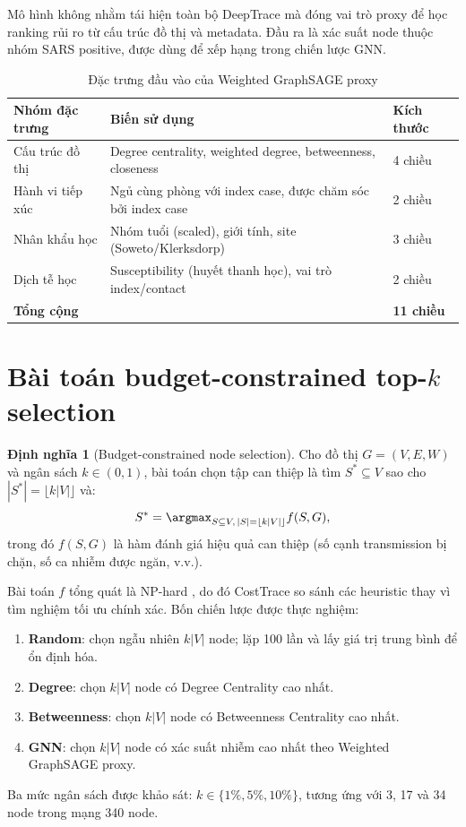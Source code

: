 \documentclass[12pt,a4paper]{report}
\theoremstyle{definition}
\newtheorem{definition}{Định nghĩa}[chapter]
\begin{document}
Mô hình không nhằm tái hiện toàn bộ DeepTrace mà đóng vai trò proxy để học ranking rủi ro từ cấu trúc đồ thị và metadata. Đầu ra là xác suất node thuộc nhóm SARS positive, được dùng để xếp hạng trong chiến lược GNN.

\begin{table}[H]
\centering
\caption{Đặc trưng đầu vào của Weighted GraphSAGE proxy}
\label{tab:gnn_features}
\begin{tabularx}{\textwidth}{L{4.5cm} Y L{3cm}}
\toprule
\textbf{Nhóm đặc trưng} & \textbf{Biến sử dụng} & \textbf{Kích thước}\\
\midrule
Cấu trúc đồ thị & Degree centrality, weighted degree, betweenness, closeness & 4 chiều\\
Hành vi tiếp xúc & Ngủ cùng phòng với index case, được chăm sóc bởi index case & 2 chiều\\
Nhân khẩu học & Nhóm tuổi (scaled), giới tính, site (Soweto/Klerksdorp) & 3 chiều\\
Dịch tễ học & Susceptibility (huyết thanh học), vai trò index/contact & 2 chiều\\
\midrule
\textbf{Tổng cộng} & & \textbf{11 chiều}\\
\bottomrule
\end{tabularx}
\end{table}

\section{Bài toán budget-constrained top-\texorpdfstring{$k$}{k} selection}

\begin{definition}[Budget-constrained node selection]
Cho đồ thị $G=(V,E,W)$ và ngân sách $k \in (0,1)$, bài toán chọn tập can thiệp là tìm $S^* \subseteq V$ sao cho $|S^*| = \lfloor k|V| \rfloor$ và:
\begin{equation}
  S^* = \argmax_{S \subseteq V,\, |S|=\lfloor k|V|\rfloor} f(S, G),
  \label{eq:topk}
\end{equation}
trong đó $f(S, G)$ là hàm đánh giá hiệu quả can thiệp (số cạnh transmission bị chặn, số ca nhiễm được ngăn, v.v.).
\end{definition}

Bài toán $f$ tổng quát là NP-hard \cite{kempe2003}, do đó CostTrace so sánh các heuristic thay vì tìm nghiệm tối ưu chính xác. Bốn chiến lược được thực nghiệm:
\begin{enumerate}[label=(\arabic*), itemsep=4pt]
  \item \textbf{Random}: chọn ngẫu nhiên $k|V|$ node; lặp 100 lần và lấy giá trị trung bình để ổn định hóa.
  \item \textbf{Degree}: chọn $k|V|$ node có Degree Centrality cao nhất.
  \item \textbf{Betweenness}: chọn $k|V|$ node có Betweenness Centrality cao nhất.
  \item \textbf{GNN}: chọn $k|V|$ node có xác suất nhiễm cao nhất theo Weighted GraphSAGE proxy.
\end{enumerate}
Ba mức ngân sách được khảo sát: $k \in \{1\%, 5\%, 10\%\}$, tương ứng với 3, 17 và 34 node trong mạng 340 node.
\end{document}
